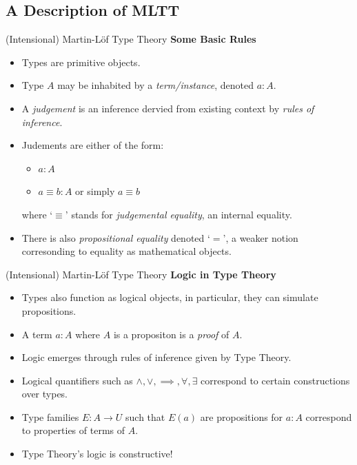 \documentclass[10pt, aspectratio=43]{beamer}
\newcommand{\deq}{\equiv}
\newcommand{\0}{\mathbf{0}}
\newcommand{\1}{\mathbf{1}}
\newcommand{\2}{\mathbf{2}}
\begin{document}
\subsection{A Description of MLTT}

\begin{frame}{(Intensional) Martin-L\"of Type Theory}
  \textbf{Some Basic Rules}
  \begin{itemize}
    \item Types are primitive objects.
    \item Type $A$ may be inhabited by a \emph{term/instance}, denoted $a : A$.
    \item A \emph{judgement} is an inference dervied from existing context by \emph{rules of inference}.
    \item Judements are either of the form:
      \begin{itemize}
      \item $a : A$ 
      \item $a \deq b : A$ or simply $a \deq b$
      \end{itemize}
    where `$\deq$' stands for \emph{judgemental equality}, an internal equality. 
    \item There is also \emph{propositional equality} denoted `$=$', a weaker notion corresonding to 
    equality as mathematical objects.
  \end{itemize}
\end{frame}

\begin{frame}{(Intensional) Martin-L\"of Type Theory} 
  \textbf{Logic in Type Theory}
  \begin{itemize}
    \item Types also function as logical objects, in particular, they can simulate propositions.
    \item A term $a : A$ where $A$ is a propositon is a \emph{proof} of $A$.
    \item Logic emerges through rules of inference given by Type Theory.
    \item Logical quantifiers such as $\land, \lor, \implies, \forall, \exists$ correspond to certain constructions over types.
    \item Type families $E : A \to U$ such that $E(a)$ are propositions for $a : A$ correspond to properties of terms of $A$.
    \item Type Theory's logic is constructive! 
   \end{itemize} 
\end{frame}
\end{document}
